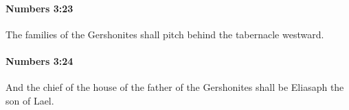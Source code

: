 		\paragraph{Numbers 3:23} %
			\label{NUMBERS-3-23}

			The families of the Gershonites shall pitch behind the tabernacle westward.


		\paragraph{Numbers 3:24} %
			\label{NUMBERS-3-24}

			And the chief of the house of the father of the Gershonites shall be Eliasaph the son of Lael.


